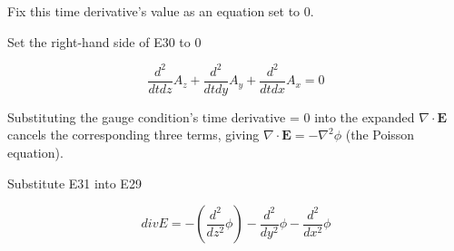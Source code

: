 \documentclass[dvipdfmx]{article}
\begin{document}
Fix this time derivative's value as an equation set to 0.

Set the right-hand side of E30 to 0

\begin{equation}
  \frac{d^2}{d t d z} A_{z}+\frac{d^2}{d t d y} A_{y}+\frac{d^2}{d t d x} A_{x} = 0
  \label{eq:E31}
\end{equation}

Substituting the gauge condition's time derivative = 0 into the expanded $\nabla\cdot\mathbf E$ cancels the corresponding three terms, giving $\nabla\cdot\mathbf E=-\nabla^2\phi$ (the Poisson equation).

Substitute E31 into E29

\begin{equation}
  divE = -\left(\frac{d^2}{d z^2} \phi\right)-\frac{d^2}{d y^2} \phi-\frac{d^2}{d x^2} \phi
  \label{eq:E32}
\end{equation}
\end{document}
